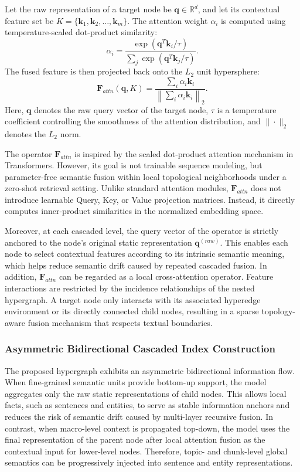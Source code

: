 \documentclass[preprint,12pt]{elsarticle}
\begin{document}
Let the raw representation of a target node be $\mathbf{q} \in \mathbb{R}^{d}$, and let its contextual feature set be $K=\{\mathbf{k}_1,\mathbf{k}_2,\ldots,\mathbf{k}_m\}$. The attention weight $\alpha_i$ is computed using temperature-scaled dot-product similarity:
\[
\alpha_i =
\frac{
\exp\left(\mathbf{q}^{T}\mathbf{k}_i/\tau\right)
}{
\sum_j \exp\left(\mathbf{q}^{T}\mathbf{k}_j/\tau\right)
}.
\]
The fused feature is then projected back onto the $L_2$ unit hypersphere:
\[
\mathbf{F}_{attn}(\mathbf{q},K)
=
\frac{
\sum_i \alpha_i \mathbf{k}_i
}{
\left\|\sum_i \alpha_i \mathbf{k}_i\right\|_2
}.
\]
Here, $\mathbf{q}$ denotes the raw query vector of the target node, $\tau$ is a temperature coefficient controlling the smoothness of the attention distribution, and $\|\cdot\|_2$ denotes the $L_2$ norm.

The operator $\mathbf{F}_{attn}$ is inspired by the scaled dot-product attention mechanism in Transformers. However, its goal is not trainable sequence modeling, but parameter-free semantic fusion within local topological neighborhoods under a zero-shot retrieval setting. Unlike standard attention modules, $\mathbf{F}_{attn}$ does not introduce learnable Query, Key, or Value projection matrices. Instead, it directly computes inner-product similarities in the normalized embedding space.

Moreover, at each cascaded level, the query vector of the operator is strictly anchored to the node's original static representation $\mathbf{q}^{(raw)}$. This enables each node to select contextual features according to its intrinsic semantic meaning, which helps reduce semantic drift caused by repeated cascaded fusion. In addition, $\mathbf{F}_{attn}$ can be regarded as a local cross-attention operator. Feature interactions are restricted by the incidence relationships of the nested hypergraph. A target node only interacts with its associated hyperedge environment or its directly connected child nodes, resulting in a sparse topology-aware fusion mechanism that respects textual boundaries.

\subsubsection{Asymmetric Bidirectional Cascaded Index Construction}

The proposed hypergraph exhibits an asymmetric bidirectional information flow. When fine-grained semantic units provide bottom-up support, the model aggregates only the raw static representations of child nodes. This allows local facts, such as sentences and entities, to serve as stable information anchors and reduces the risk of semantic drift caused by multi-layer recursive fusion. In contrast, when macro-level context is propagated top-down, the model uses the final representation of the parent node after local attention fusion as the contextual input for lower-level nodes. Therefore, topic- and chunk-level global semantics can be progressively injected into sentence and entity representations.
\end{document}
